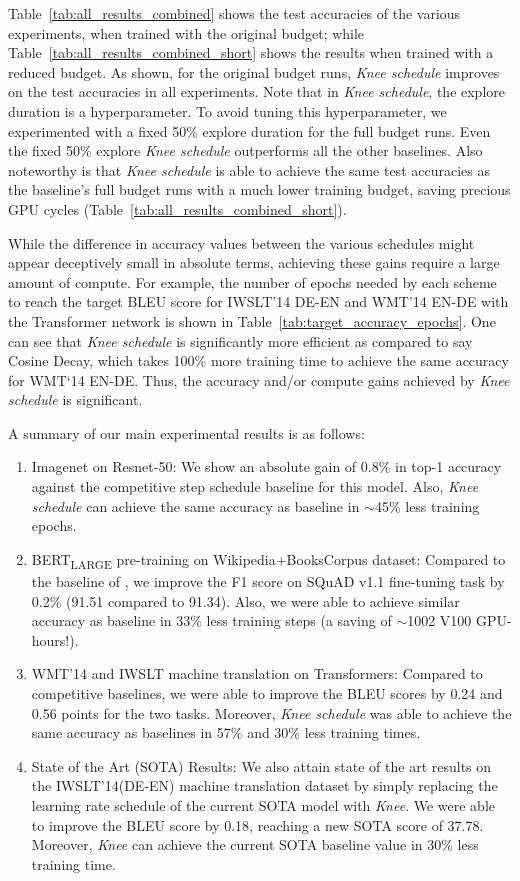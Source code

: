 \documentclass[twoside,11pt]{article}
\newcommand{\lrschedule}{\textit{Knee schedule}}
\newcommand{\lrscheduleshort}{\textit{Knee}}
\begin{document}
Table~\ref{tab:all_results_combined} shows the test accuracies of the various experiments, when trained with the original budget; while Table~\ref{tab:all_results_combined_short} shows the results when trained with a reduced budget. As shown, for the original budget runs, \lrschedule{} improves on the test accuracies in all experiments.  Note that in \lrschedule{}, the explore duration is a hyperparameter. To avoid tuning this hyperparameter, we experimented with a fixed 50\% explore duration for the full budget runs. Even the fixed 50\% explore \lrschedule{} outperforms all the other baselines. Also noteworthy is that \lrschedule{} is able to achieve the same test accuracies as the baseline's full budget runs with a much lower training budget, saving precious GPU cycles (Table~\ref{tab:all_results_combined_short}). 



While the difference in accuracy values between the various schedules might appear deceptively small in absolute terms, achieving these gains require a large amount of compute. For example, 
the number of epochs needed by each scheme to reach the target BLEU score for IWSLT'14 DE-EN and WMT'14 EN-DE with the Transformer network is shown in Table~\ref{tab:target_accuracy_epochs}. One can see that \lrschedule{} is significantly more efficient as compared to say Cosine Decay, which takes 100\% more training time to achieve the same accuracy for WMT`14 EN-DE. Thus, the accuracy and/or compute gains achieved by \lrschedule{} is significant.

A summary of our main experimental results is as follows:
\begin{enumerate}\item Imagenet on Resnet-50: We show an absolute gain of 0.8\% in top-1 accuracy against the competitive step schedule baseline for this model. Also, \lrschedule{} can achieve the same accuracy as baseline in $\sim$45\% less training epochs.
\item BERT\textsubscript{LARGE} pre-training on  Wikipedia+BooksCorpus dataset: Compared to the baseline of \cite{bert76lamb}, we improve the F1 score on SQuAD v1.1 fine-tuning task by 0.2\% (91.51 compared to 91.34). Also, we were able to achieve similar accuracy as baseline in 33\% less training steps (a saving of $\sim$1002 V100 GPU-hours!).
 \item WMT'14 and IWSLT machine translation on Transformers: Compared to competitive baselines, we were able to improve the BLEU scores by 0.24 and 0.56 points for the two tasks. Moreover, \lrschedule{} was able to achieve the same accuracy as baselines in 57\% and 30\% less training times.
 \item State of the Art (SOTA) Results: We also attain state of the art results on the IWSLT'14(DE-EN) machine translation dataset by simply replacing the learning rate schedule of the current SOTA model \citep{shen2020simple} with \lrscheduleshort{}. We were able to improve the BLEU score by 0.18, reaching a new SOTA score of 37.78. Moreover, \lrscheduleshort{} can achieve the current SOTA baseline value in 30\% less training time.
\end{enumerate}
\end{document}
